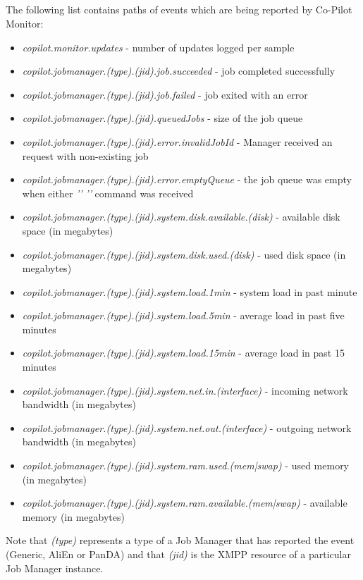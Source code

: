 \subsection{}
\label{sct:monitoredevents}
The following list contains paths of events which are being reported by Co-Pilot Monitor:

\begin{itemize}
  \item \emph{copilot.monitor.updates} - number of updates logged per sample
  \item \emph{copilot.jobmanager.(type).(jid).job.succeeded} - job completed successfully 
  \item \emph{copilot.jobmanager.(type).(jid).job.failed} - job exited with an error
  \item \emph{copilot.jobmanager.(type).(jid).queuedJobs} - size of the job queue
  \item \emph{copilot.jobmanager.(type).(jid).error.invalidJobId} - Manager received an request with non-existing job
  \item \emph{copilot.jobmanager.(type).(jid).error.emptyQueue} - the job queue was empty when either \emph{''} \emph{''} command was received
  \item \emph{copilot.jobmanager.(type).(jid).system.disk.available.(disk)} - available disk space (in megabytes)
  \item \emph{copilot.jobmanager.(type).(jid).system.disk.used.(disk)} - used disk space (in megabytes)
  \item \emph{copilot.jobmanager.(type).(jid).system.load.1min} - system load in past minute
  \item \emph{copilot.jobmanager.(type).(jid).system.load.5min} - average load in past five minutes
  \item \emph{copilot.jobmanager.(type).(jid).system.load.15min} - average load in past 15 minutes
  \item \emph{copilot.jobmanager.(type).(jid).system.net.in.(interface)} - incoming network bandwidth (in megabytes)
  \item \emph{copilot.jobmanager.(type).(jid).system.net.out.(interface)} - outgoing network bandwidth (in megabytes)
  \item \emph{copilot.jobmanager.(type).(jid).system.ram.used.(mem|swap)} - used memory (in megabytes)
  \item \emph{copilot.jobmanager.(type).(jid).system.ram.available.(mem|swap)} - available memory (in megabytes)
\end{itemize}

Note that \emph{(type)} represents a type of a Job Manager that has reported the event (Generic, AliEn or PanDA) and that \emph{(jid)} is the XMPP resource of a particular Job Manager instance.
